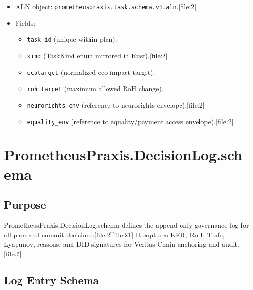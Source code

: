 \documentclass[11pt]{article}
\begin{document}
\begin{itemize}[nosep]
  \item ALN object: \texttt{prometheuspraxis.task.schema.v1.aln}.[file:2]
  \item Fields:
    \begin{itemize}[nosep]
      \item \texttt{task\_id} (unique within plan).
      \item \texttt{kind} (TaskKind enum mirrored in Rust).[file:2]
      \item \texttt{ecotarget} (normalized eco-impact target).
      \item \texttt{roh\_target} (maximum allowed RoH change).
      \item \texttt{neurorights\_env} (reference to neurorights envelope).[file:2]
      \item \texttt{equality\_env} (reference to equality/payment access envelope).[file:2]
    \end{itemize}
\end{itemize}

\section{PrometheusPraxis.DecisionLog.schema}

\subsection{Purpose}

PrometheusPraxis.DecisionLog.schema defines the append-only governance log for all plan and commit decisions.[file:2][file:81]
It captures KER, RoH, Tsafe, Lyapunov, reasons, and DID signatures for Veritas-Chain anchoring and audit.[file:2]

\subsection{Log Entry Schema}
\end{document}
